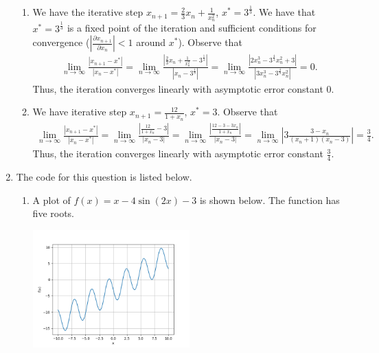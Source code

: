 \documentclass[10pt]{article}
\begin{document}
\begin{enumerate}
\begin{enumerate}
      \item We have the iterative step \(x_{n+1} = \frac{2}{3}x_n + \frac{1}{x_n^2}\), \(x^* = 3^\frac{1}{3}\). We have that \(x^*=3^\frac{1}{3}\) is a fixed point of the iteration and sufficient conditions for convergence (\(\left|\frac{\partial x_{n+1}}{\partial x_n}\right| < 1\) around \(x^*\)). Observe that \begin{align*}
          \lim _{n \to \infty} \frac{|x_{n+1} - x^*|}{|x_n - x^*|} = \lim _{n \to \infty} \frac{|\frac{2}{3}x_n + \frac{1}{x_n^2} - 3^\frac{1}{3}|}{|x_n - 3^\frac{1}{3}|} = \lim _{n \to \infty} \frac{|2x_n^3 -3^\frac{4}{3}x_n^2 + 3|}{|3x_n^3 - 3^\frac{4}{3}x_n^2|} = 0.
      \end{align*} Thus, the iteration converges linearly with asymptotic error constant 0.

      \item We have iterative step \(x_{n+1} = \frac{12}{1+x_n}\), \(x^* = 3\). Observe that \begin{align*}
        \lim _{n \to \infty} \frac{|x_{n+1} - x^*|}{|x_n - x^*|} = \lim _{n \to \infty} \frac{\left|\frac{12}{1+x_n} - 3\right|}{\left|x_n - 3\right|} = \lim _{n \to \infty} \frac{\left|\frac{12-3-3x_n}{1+x_n}\right|}{\left|x_n - 3\right|} = \lim _{n \to \infty} \left| 3\frac{3-x_n}{(x_n + 1)(x_n - 3)} \right| = \frac{3}{4}.
      \end{align*} Thus, the iteration converges linearly with asymptotic error constant \(\frac{3}{4}\).
    \end{enumerate}

    \newpage
    \item The code for this question is listed below. \begin{enumerate}
      \item A plot of \(f(x) = x - 4\sin(2x) - 3\) is shown below. The function has five roots.
      
      \begin{center}
        \includegraphics[width=0.5\textwidth]{hw3_5_a.png}
      \end{center}


\end{enumerate}
\end{enumerate}
\end{document}
